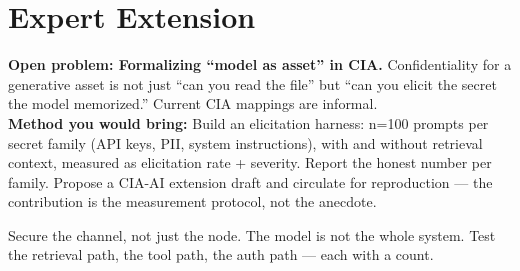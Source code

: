 
\section{Expert Extension}
\rbadge
\textbf{Open problem: Formalizing ``model as asset'' in CIA.} Confidentiality for a generative asset is not just ``can you read the file'' but ``can you elicit the secret the model memorized.'' Current CIA mappings are informal.\\
\textbf{Method you would bring:} Build an elicitation harness: n=100 prompts per secret family (API keys, PII, system instructions), with and without retrieval context, measured as elicitation rate + severity. Report the honest number per family. Propose a CIA-AI extension draft and circulate for reproduction — the contribution is the measurement protocol, not the anecdote.

\begin{checkbox}
Secure the channel, not just the node. The model is not the whole system. Test the retrieval path, the tool path, the auth path — each with a count.
\end{checkbox}
